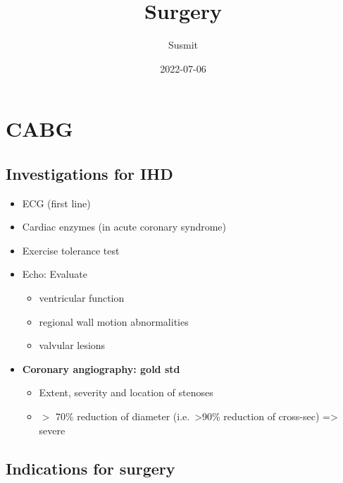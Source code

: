 \documentclass[
  12pt,
]{memoir}
\title{Surgery}
\author{Susmit}
\date{2022-07-06}
\providecommand{\tightlist}{%
  \setlength{\itemsep}{0pt}\setlength{\parskip}{0pt}}
\begin{document}
\frontmatter
\maketitle

\mainmatter
\openany  \raggedbottom \twocoltocetc \tableofcontents

\pagebreak

\hypertarget{cabg}{%
\chapter{CABG}\label{cabg}}

\hypertarget{investigations-for-ihd}{%
\section{Investigations for IHD}\label{investigations-for-ihd}}

\begin{itemize}
\tightlist
\item
  ECG (first line)
\item
  Cardiac enzymes (in acute coronary syndrome)
\item
  Exercise tolerance test
\item
  Echo: Evaluate

  \begin{itemize}
  \tightlist
  \item
    ventricular function
  \item
    regional wall motion abnormalities
  \item
    valvular lesions
  \end{itemize}
\item
  \textbf{Coronary angiography: gold std}

  \begin{itemize}
  \tightlist
  \item
    Extent, severity and location of stenoses
  \item
    \(>\) 70\% reduction of diameter (i.e.~\textgreater90\% reduction of
    cross-sec) =\textgreater{} severe
  \end{itemize}
\end{itemize}

\hypertarget{indications-for-surgery}{%
\section{Indications for surgery}\label{indications-for-surgery}}
\end{document}
